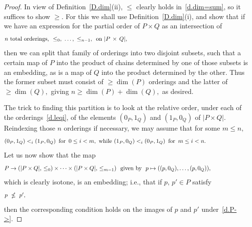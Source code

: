 \documentclass{amsart}
\numberwithin{equation}{section}
\numberwithin{theorem}{section}
\newcommand{\2}{\mathbf{2}}
\begin{document}
\begin{proof}
In view of Definition~\ref{D.dim}(ii), $\leq$ clearly
holds in~\eqref{d.dim=sum}, so it suffices to show $\geq.$
For this we shall use Definition~\ref{D.dim}(i),
and show that if we have an expression for the partial order
of $P\times Q$ as an intersection of
%
\begin{equation}\begin{minipage}[c]{35pc}\label{d.leqi}
$n$ total orderings, \ $\leq_0,\ \dots,\ \leq_{n-1},$ \ %
on\ $|P\,\times\,Q|,$
\end{minipage}\end{equation}
%
then we can split that family of orderings into
two disjoint subsets, such that a certain map of $P$ into
the product of chains determined by one of those subsets is
an embedding, as is a map of
$Q$ into the product determined by the other.
Thus the former subset must consist of $\geq\dim(P)$
orderings and the latter of $\geq\dim(Q),$ giving
$n\geq\dim(P)+\dim(Q),$ as desired.

The trick to finding this partition is to look at the
relative order, under each of the orderings~\eqref{d.leqi},
of the elements $(0_P,1_Q)$ and $(1_P,0_Q)$ of $|P\times Q|.$
Reindexing those $n$ orderings if necessary, we may assume that
for some $m\leq n,$
%
\begin{equation}\begin{minipage}[c]{35pc}\label{d.(0,1)vs(1,0)}
$(0_P,1_Q) <_i (1_P,0_Q)$ \,for\, $0\leq i < m,$ \,while
$(1_P,0_Q) <_i (0_P,1_Q)$ \,for\, $m\leq i < n.$
\end{minipage}\end{equation}
%
Let us now show that the map
%
\begin{equation}\begin{minipage}[c]{35pc}\label{d.P->}
$P\to (|P\times Q|,\,\leq_0)\times\dots\times(|P\times Q|,\,\leq_{m-1})$
\ given by \ $p\mapsto ((p,0_Q),\dots,(p,0_Q)),$
\end{minipage}\end{equation}
%
which is clearly isotone, is an embedding;
i.e., that if $p,\,p'\in P$ satisfy
%
\begin{equation}\begin{minipage}[c]{35pc}\label{d.nleq}
$p\ \nleq\ p',$
\end{minipage}\end{equation}
%
then the corresponding condition holds on
the images of $p$ and $p'$ under~\eqref{d.P->}.


\end{proof}
\end{document}
